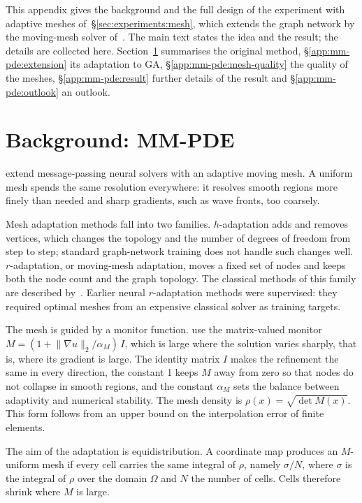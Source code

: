 This appendix gives the background and the full design of the experiment
with adaptive meshes of~\S\ref{sec:experiments:mesh}, which extends the
graph network by the moving-mesh solver of~\citet{Hu2024}. The main text
states the idea and the result; the details are collected here.
Section~\ref{app:mm-pde:background} summarises the original method,
\S\ref{app:mm-pde:extension} its adaptation to GA,
\S\ref{app:mm-pde:mesh-quality} the quality of the meshes,
\S\ref{app:mm-pde:result} further details of the result and
\S\ref{app:mm-pde:outlook} an outlook.

\section{Background: MM-PDE}
\label{app:mm-pde:background}

\citet{Hu2024} extend message-passing neural solvers with an adaptive
moving mesh. A uniform mesh spends the same resolution everywhere: it
resolves smooth regions more finely than needed and sharp gradients, such
as wave fronts, too coarsely.

Mesh adaptation methods fall into two families. $h$-adaptation adds and
removes vertices, which changes the topology and the number of degrees of
freedom from step to step; standard graph-network training does not handle
such changes well. $r$-adaptation, or moving-mesh adaptation, moves a fixed
set of nodes and keeps both the node count and the graph topology. The
classical methods of this family are described by~\citet{HuangRussell2011}.
Earlier neural $r$-adaptation methods were supervised: they required
optimal meshes from an expensive classical solver as training targets.

The mesh is guided by a monitor function. \citet{Hu2024} use the
matrix-valued monitor
$M = (1 + \lVert \nabla u \rVert_2 / \alpha_M)\, I$, which is large where
the solution varies sharply, that is, where its gradient is large. The identity matrix $I$ makes the refinement
the same in every direction, the constant 1 keeps $M$ away from zero so
that nodes do not collapse in smooth regions, and the constant $\alpha_M$
sets the balance between adaptivity and numerical stability. The mesh
density is $\rho(x) = \sqrt{\det M(x)}$. This form follows from an upper
bound on the interpolation error of finite elements.

The aim of the adaptation is equidistribution. A coordinate map produces
an $M$-uniform mesh if every cell carries the same integral of $\rho$,
namely $\sigma / N$, where $\sigma$ is the integral of $\rho$ over the
domain $\Omega$ and $N$ the number of cells. Cells therefore shrink where
$M$ is large.

